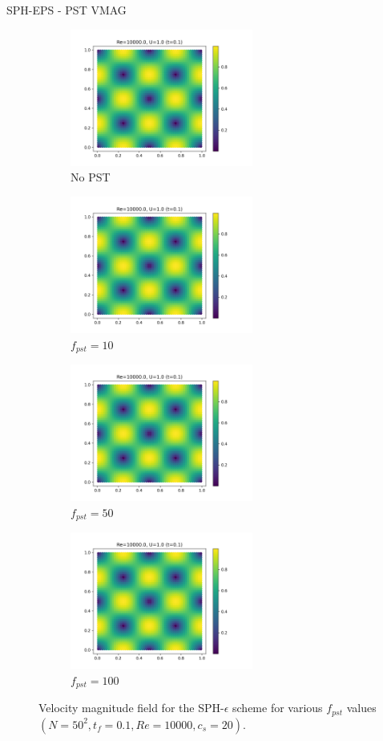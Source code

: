 SPH-EPS - PST VMAG 
\begin{figure}[H]
  \begin{subfigure}{7cm}
  \centering\includegraphics[width=6cm]{Code-Figures/mon2017/pst/c0_20_tait_pec_dtmul_1_nx_50_pst_-1_re_10000_mon2017/final_vmag.png}
  \caption{No PST}
  \end{subfigure}
  \begin{subfigure}{7cm}
  \centering\includegraphics[width=6cm]{Code-Figures/mon2017/pst/c0_20_tait_pec_dtmul_1_nx_50_pst_10_re_10000_mon2017/final_vmag.png}
  \caption{$f_{pst} = 10$}
  \end{subfigure}
  \begin{subfigure}{7cm}
  \centering\includegraphics[width=6cm]{Code-Figures/mon2017/pst/c0_20_tait_pec_dtmul_1_nx_50_pst_50_re_10000_mon2017/final_vmag.png}
  \caption{$f_{pst} = 50$}
  \end{subfigure}
  \begin{subfigure}{7cm}
  \centering\includegraphics[width=6cm]{Code-Figures/mon2017/pst/c0_20_tait_pec_dtmul_1_nx_50_pst_100_re_10000_mon2017/final_vmag.png}
  \caption{$f_{pst} = 100$}
  \end{subfigure}
  \caption{Velocity magnitude field for the SPH-$\epsilon$ scheme for various $f_{pst}$ values $(N=50^2, t_f=0.1, Re=10000, c_s=20)$.}
  \label{fig:sph-eps-pst-vmag}
\end{figure}

